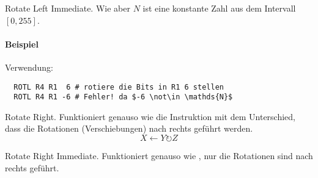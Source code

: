 \glqq Rotate Left Immediate\grqq.
Wie  aber $N$ ist eine konstante Zahl aus dem Intervall $[0, 255]$.

\paragraph{Beispiel}
Verwendung:
\begin{lstlisting}
  ROTL R4 R1  6 # rotiere die Bits in R1 6 stellen
  ROTL R4 R1 -6 # Fehler! da $-6 \not\in \mathds{N}$
\end{lstlisting}



\glqq Rotate Right\grqq.
Funktioniert genauso wie die Instruktion  mit dem Unterschied, dass
die Rotationen (Verschiebungen) nach rechts geführt werden.
\[
    X \gets Y \circlearrowright Z
\]


\glqq Rotate Right Immediate\grqq.
Funktioniert genauso wie , nur die Rotationen sind nach rechts
geführt.



